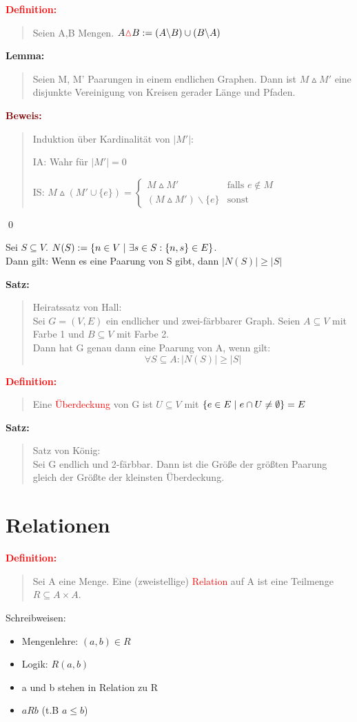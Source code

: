 \documentclass{article}
\newcommand{\smsp}{\phantom{\hspace{3px}}}
\newcommand{\red}[1]{\textcolor{red}{#1}}
\newcommand{\dgr}[1]{\textcolor{dgr}{#1}}
\newcommand{\maroon}[1]{\textcolor{maroon}{#1}}
\newcommand{\de}[1]{\red{\textbf{Definition: }}\begin{quote}#1\end{quote}}
\newcommand{\se}[1]{\dgr{\textbf{Satz: }}\begin{quote}#1\end{quote}}
\newcommand{\lem}[1]{\dgr{\textbf{Lemma: }}\begin{quote}#1\end{quote}}
\newcommand{\pr}[1]{\maroon{\textbf{Beweis: }}\begin{quote}#1\end{quote}\qed}
\renewcommand{\st}{\smsp | \smsp}
\newcommand{\xor}{\mathbin{\vartriangle}}
\begin{document}
\de{
    Seien A,B Mengen. $A \red{\xor} B := (A \backslash B) \cup (B \backslash A)$
}

\lem{
    Seien M, M' Paarungen in einem endlichen Graphen. Dann ist $M \xor M'$ eine disjunkte Vereinigung von Kreisen gerader Länge und Pfaden.
}
\pr{
    Induktion über Kardinalität von $|M'|$:

    IA: Wahr für $|M'| = 0$

    IS: $M \xor (M' \cup \{e\}) = \begin{cases}
        M \xor M' & \text{falls $e \notin M$}\\
        (M \xor M') \backslash \{e\} & \text{sonst}
    \end{cases}$
}

Sei $S \subseteq V$. $N(S) := \{n \in V \st \exists s \in S: \{n,s\} \in E\}$.\\
Dann gilt: Wenn es eine Paarung von S gibt, dann $|N(S)| \ge |S|$

\se{
    Heiratssatz von Hall:\\
    Sei $G=(V,E)$ ein endlicher und zwei-färbbarer Graph. Seien $A \subseteq V$ mit Farbe 1 und $B \subseteq V$ mit Farbe 2.\\
    Dann hat G genau dann eine Paarung von A, wenn gilt:
    \[
        \forall S \subseteq A: |N(S)| \ge |S|
    \]
}

\de{
    Eine \red{Überdeckung} von G ist $U \subseteq V$ mit $\{e \in E \st e \cap U \ne \emptyset\} = E$
}

\se{
    Satz von König:\\
    Sei G endlich und 2-färbbar. Dann ist die Größe der größten Paarung gleich der Größte der kleinsten Überdeckung.
}

\newpage
\section{Relationen}

\de{
    Sei A eine Menge. Eine (zweistellige) \red{Relation} auf A ist eine Teilmenge $R \subseteq A \times A$.
}

Schreibweisen:
\begin{itemize}
    \item Mengenlehre: $(a,b) \in R$
    \item Logik: $R(a,b)$
    \item a und b stehen in Relation zu R
    \item $aRb$ (t.B $a \le b$)
\end{itemize}
\end{document}
